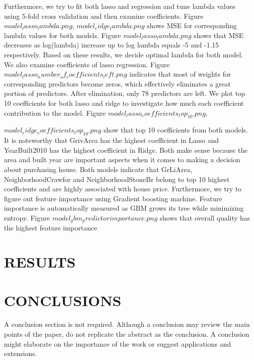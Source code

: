 \documentclass[letterpaper, 10 pt, conference]{ieeeconf}  %
\begin{document}
Furthermore, we try to fit both lasso and regression and tune lambda values using 5-fold cross validation and then examine coefficients. Figure $model_lasso_lambda.png$, $model_ridge_lambda.png$ shows MSE for corresponding lambda values for both models. Figure $model_lasso_lambda.png$ shows that MSE decreases as log(lambda) increase up to log lambda equals -5 and  -1.15 respectively. Based on these results, we decide optimal lambda for both model. We also examine coefficients of lasso regression. Figure $model_lasso_number_of_coefficients_left.png$ indicates that most of weights for corresponding predictors become zeros, which effectively eliminates a great portion of predictors. After elimination, only 78 predictors are left. We plot top 10 coefficients for both lasso and ridge to investigate how much each coefficient contribution to the model. Figure $model_lasso_coefficients_top_10.png$,

$model_ridge_coefficients_top_10.png$ show that top 10 coefficients from both models. It is noteworthy that GrivArea has the highest coefficient in Lasso and YearBuilt2010 has the highest coefficient in Ridge. Both make sense because the area and built year are important aspects when it comes to making a decision about purchasing house. Both models indicate that GrLiArea, NeighborhoodCrawfor and NeighborhoodStoneBr belong to top 10 highest coefficients and are highly associated with house price. Furthermore, we try to figure out feature importance using Gradient boosting machine. Feature importance is automatically measured as GBM grows its tree while minimizing entropy. Figure $model_gbm_predictor importance.png$ shows that overall quality has the highest feature importance 

\section{RESULTS}

\section{CONCLUSIONS}

A conclusion section is not required. Although a conclusion may review the main points of the paper, do not replicate the abstract as the conclusion. A conclusion might elaborate on the importance of the work or suggest applications and extensions. 

\addtolength{\textheight}{-12cm}   %
\end{document}
